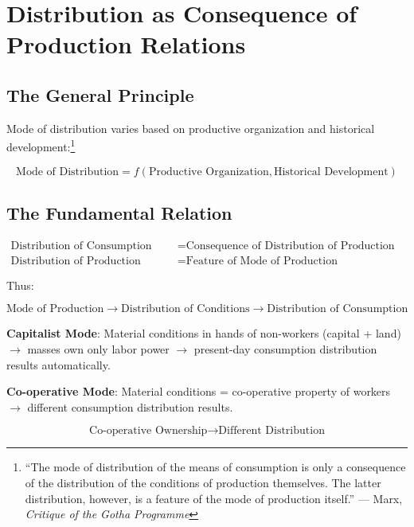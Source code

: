 \documentclass[12pt,a4paper]{article}
\begin{document}
\section{Distribution as Consequence of Production Relations}

\subsection{The General Principle}

Mode of distribution varies based on productive organization and historical development:\footnote{``The mode of distribution of the means of consumption is only a consequence of the distribution of the conditions of production themselves. The latter distribution, however, is a feature of the mode of production itself.'' --- Marx, \textit{Critique of the Gotha Programme}}

\begin{equation}
\text{Mode of Distribution} = f(\text{Productive Organization}, \text{Historical Development})
\end{equation}

\subsection{The Fundamental Relation}

\begin{align}
\text{Distribution of Consumption} &= \text{Consequence of Distribution of Production Conditions} \\
\text{Distribution of Production Conditions} &= \text{Feature of Mode of Production}
\end{align}

Thus:

\begin{equation}
\text{Mode of Production} \rightarrow \text{Distribution of Conditions} \rightarrow \text{Distribution of Consumption}
\end{equation}

\textbf{Capitalist Mode}: Material conditions in hands of non-workers (capital + land) $\rightarrow$ masses own only labor power $\rightarrow$ present-day consumption distribution results automatically.

\textbf{Co-operative Mode}: Material conditions = co-operative property of workers $\rightarrow$ different consumption distribution results.

\begin{equation}
\text{Co-operative Ownership} \rightarrow \text{Different Distribution}
\end{equation}
\end{document}
